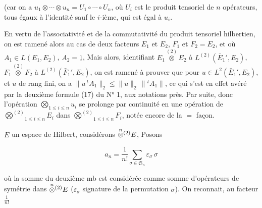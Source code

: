 (car on a $u_1\otimes\cdots\otimes u_n=U_1\circ\cdots\circ U_n$, où $U_i$ est le
produit tensoriel de $n$ opérateurs, tous égaux à l'identité
sauf le $i$-ième, qui est égal à $u_i$. 


En vertu de l'associativité et de la commutativité du
produit tensoriel hilbertien, on  est ramené alors au cas de
deux facteurs $E_1$ et $E_2$, $F_1$ et $F_2=E_2$, et où $A_1\in L(E_1,E_2)$, $A_2=\underline1$,
Mais alors, identifiant $E_1\overset{(2)}{\otimes}E_2$ à $L^{(2)}(\bar E_1',E_2)$, $F_1\overset{(2)}{\otimes}F_2$ à
$L^{(2)}(\bar F_1',E_2)$,  on est ramené
à prouver que pour $u\in L^2(\bar E_1',E_2)$, et $u$ de rang fini,
on a $\|u\,{}^tA_1\|_2\leq\|u\|_2\,\|{}^tA_1\|$, ce qui s'est en effet
avéré par la  deuxième formule (17) du N° 1,
aux notations près. Par suite,  
donc l'opération $\bigotimes_{1\leq i\leq n}u_i$  se  prolonge
par continuité en une opération de $\overset{(2)}{\bigotimes}_{1\leq i\leq n}E_i$ dans
$\overset{(2)}{\bigotimes}_{1\leq i\leq n}F_i$, notée encore de la $=$ façon. 

 $E$ un espace de Hilbert, considérons
$\overset{n}{\otimes}\vphantom{\otimes}^{(2)}E$,  Posons

\[
a_n=\frac1{n!}\sum_{\sigma\in\mathfrak S_n}\varepsilon_\sigma\,\sigma \tag*{(3)}
\]

où la somme du deuxième mb est considérée comme
somme d'opérateurs de symétrie dans $\overset{n}{\otimes}\vphantom{\otimes}^{(2)}E$ ($\varepsilon_\sigma$ signature
de la permutation $\sigma$).  On reconnait, au facteur $\frac1{n!}$

